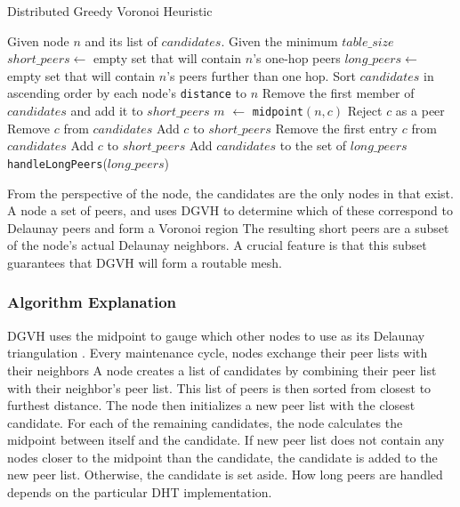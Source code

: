 \documentclass[11pt,conference]{IEEEtran}
\begin{document}
\begin{algorithm} %
	\caption{Distributed Greedy Voronoi Heuristic}
	\label{alg:dgvh}
	\begin{algorithmic}[1]  %
		\STATE Given node $n$ and its list of $candidates$.
		\STATE Given the minimum $table\_size$
		\STATE $short\_peers \leftarrow$ empty set that will contain $n$'s one-hop peers
		\STATE $long\_peers \leftarrow$ empty set that will contain $n$'s peers further than one hop.
		\STATE Sort $candidates$ in ascending order by each node's \texttt{distance} to $n$
		\STATE Remove the first member of $candidates$ and add it to $short\_peers$
			\STATE $m$ $ \leftarrow $ \texttt{midpoint}$( n, c )$
				\STATE Reject $c$ as a peer
			\ELSE
				\STATE Remove $c$ from $candidates$
				\STATE Add $c$ to $short\_peers$
			\ENDIF
		\ENDFOR
			\STATE Remove the first entry $c$ from $candidates$
			\STATE Add $c$ to $short\_peers$
		\ENDWHILE
		\STATE Add $candidates$ to the set of $long\_peers$	
		\STATE \texttt{handleLongPeers}($long\_peers$)
	\end{algorithmic}
\end{algorithm} 


From the perspective of the node, the candidates are the only nodes in that exist.
A node a set of peers, and uses DGVH to determine which of these correspond to Delaunay peers and form a Voronoi region
The resulting short peers are a subset of the node's actual Delaunay neighbors.
A crucial feature is that this subset guarantees that DGVH will form a routable mesh.


\subsubsection*{Algorithm  Explanation}
DGVH uses the midpoint to gauge which other nodes to use as its Delaunay triangulation \cite{dgvh}.
Every maintenance cycle, nodes exchange their peer lists with their neighbors
A node creates a list of candidates by combining their peer list with  their neighbor's peer list.
This list of peers is then sorted from closest to furthest distance.
The node then initializes a new peer list with the closest candidate.
For each of the remaining candidates, the node calculates the midpoint between itself and the candidate.
If new peer list does not contain any nodes closer to the midpoint than the candidate, the candidate is added to the new peer list.
Otherwise, the candidate is set aside.
How long peers are handled depends on the particular DHT implementation.
\end{document}
